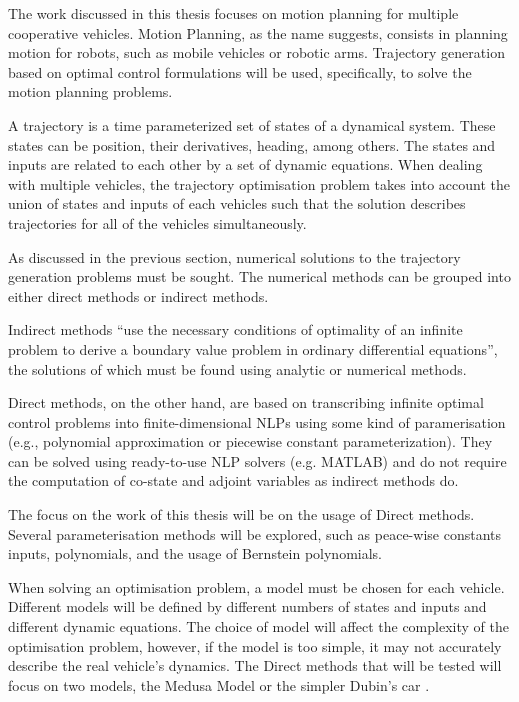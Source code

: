 \par The work discussed in this thesis focuses on motion planning for multiple cooperative vehicles. Motion Planning, as the name suggests, consists in planning motion for robots, such as mobile vehicles or robotic arms. Trajectory generation based on optimal control formulations will be used, specifically, to solve the motion planning problems. 
\par A trajectory is a time parameterized set of states of a dynamical system. These states can be position, their derivatives, heading, among others. The states and inputs are related to each other by a set of dynamic equations. When dealing with multiple vehicles, the trajectory optimisation problem takes into account the union of states and inputs of each vehicles such that the solution describes trajectories for all of the vehicles simultaneously.
\par As discussed in the previous section, numerical solutions to the trajectory generation problems must be sought. The numerical methods can be grouped into either direct methods or indirect methods. 
\par Indirect methods “use the necessary conditions of optimality of an infinite problem to derive a boundary value problem in ordinary differential equations”, the solutions of which must be found using analytic or numerical methods. 
\par Direct methods, on the other hand, are based on transcribing infinite optimal control problems into finite-dimensional \acp{NLP} using some kind of paramerisation (e.g., polynomial approximation or piecewise constant parameterization). They can be solved using ready-to-use NLP solvers (e.g. MATLAB) and do not require the computation of co-state and adjoint variables as indirect methods do.
\par The focus on the work of this thesis will be on the usage of Direct methods. Several parameterisation methods will be explored, such as peace-wise constants inputs, polynomials, and the usage of Bernstein polynomials.
\par When solving an optimisation problem, a model must be chosen for each vehicle. 
Different models will be defined by different numbers of states and inputs and different dynamic equations. The choice of model will affect the complexity of the optimisation problem, however, if the model is too simple, it may not accurately describe the real vehicle's dynamics. The Direct methods that will be tested will focus on two models, the Medusa Model \cite{abreu2016medusa} or the simpler Dubin's car \cite{Reeds1990OPTIMALPF}.


